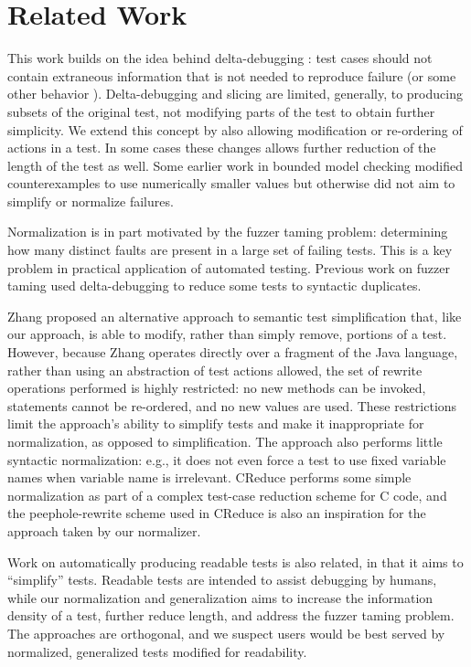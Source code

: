 \section{Related Work}

This work builds on the idea behind delta-debugging \cite{DD}: test
cases should not contain extraneous information that is not needed to
reproduce failure (or some other behavior \cite{icst2014,stvrcausereduce}).  Delta-debugging and slicing
\cite{TCminim} are limited, generally, to producing subsets of the
original test, not modifying parts of the test to obtain further
simplicity.  We extend this concept by also allowing modification or
re-ordering of actions in a test.  In some cases these changes
allows further reduction of the length of the test as well.  Some
earlier work in bounded model checking modified counterexamples to use
numerically smaller values \cite{MakeMost} but otherwise did not aim
to simplify or normalize failures.

Normalization is in part motivated by the fuzzer taming \cite{PLDI13}
problem: determining how many distinct faults are present in a large
set of failing tests.  This is a key problem in practical
application of automated testing.  Previous work on fuzzer taming
\cite{PLDI13} used delta-debugging to reduce some tests to
syntactic duplicates.

Zhang \cite{SaiSimple} proposed an alternative approach to semantic
test simplification that, like our approach, is able to modify, rather
than simply remove, portions of a test.  However, because Zhang
operates directly over a fragment of the Java language, rather than
using an abstraction of test actions allowed, the set of rewrite
operations performed is highly restricted: no new methods can be
invoked, statements cannot be re-ordered, and no new values are used.
These restrictions limit the approach's ability to simplify tests and
make it inappropriate for  normalization, as opposed to simplification.  The approach also performs little
syntactic normalization: e.g., it does not even force a test to use
fixed variable names when variable name is irrelevant.  CReduce
\cite{CReduce} performs some simple normalization as part of a complex
test-case reduction scheme for C code, and the peephole-rewrite scheme
used in CReduce is also an inspiration for the approach taken by our
normalizer.

Work on automatically producing readable tests \cite{Guava,Readable} is also
related, in that it aims to ``simplify'' tests.  Readable tests are
intended to assist debugging by humans, while our
normalization and generalization aims to increase the information
density of a test, further reduce length, and address the fuzzer taming problem.  The approaches are
orthogonal, and we suspect users would be best served by normalized,
generalized tests modified for readability.

